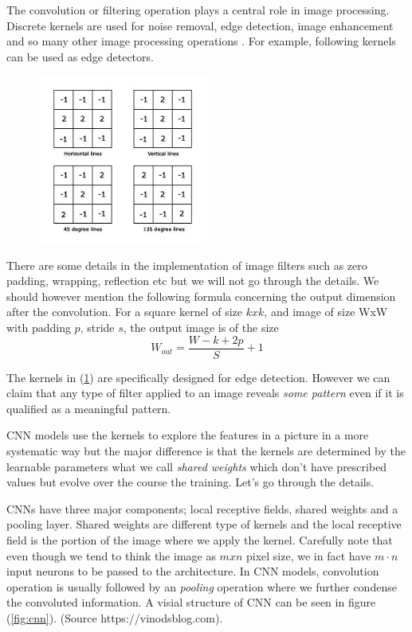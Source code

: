 \documentclass[12pt]{article}
\begin{document}
The convolution or filtering operation plays a central role in image processing. Discrete kernels are used for noise removal, edge detection, image enhancement and so many other image processing operations \cite{IP}. For example, following kernels can be used as edge detectors. 

 \begin{figure}[H]
 \label{fig:edge}
  \centering
  \includegraphics[width=0.5\textwidth]{detec.png}
\end{figure}

There are some details in the implementation of image filters such as zero padding, wrapping, reflection etc but we will not go through the details. We should however mention the following formula concerning the output dimension after the convolution. For a square kernel of size $kxk$, and image of size WxW with padding $p$, stride $s$, the output image is of the size 
$$
W_{out} = \dfrac{W-k+2p}{S}+1
$$ 

The kernels in (\ref{fig:edge}) are specifically designed for edge detection. However we can claim that any type of filter applied to an image reveals \textit{some pattern} even if it is qualified as a meaningful pattern. 

CNN models use the kernels to explore the features in a picture in a more systematic way but the major difference is that the kernels are determined by the learnable parameters what we call \textit{shared weights} which don't have prescribed values but evolve over the course the training. Let's  go through the details.   


CNNs have three major components; local receptive fields, shared weights and a pooling layer. Shared weights are different type of kernels and the local receptive field is the portion of the image where we apply the kernel. Carefully note that even though we tend to think the image as $mxn$ pixel size, we in fact have $m\cdot n$ input neurons to be passed to the architecture. In CNN models, convolution operation is usually followed by an \textit{pooling} operation where we further condense the convoluted information. A visial structure of CNN can be seen in figure (\ref{fig:cnn}). (Source https://vinodsblog.com).
\end{document}
